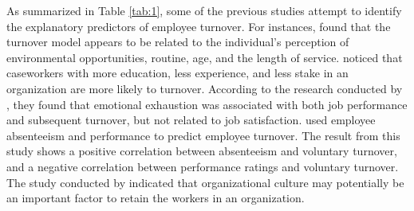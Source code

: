 As summarized in Table \ref{tab:1}, some of the previous studies attempt to identify the explanatory predictors of employee turnover. For instances, \citet{bluedorn1982} found that the turnover model appears to be related to the individual’s perception of environmental opportunities, routine, age, and the length of service. \citet{balfour1993} noticed that caseworkers with more education, less experience, and less stake in an organization are more likely to turnover. According to the research conducted by \citet{wright1998}, they found that emotional exhaustion was associated with both job performance and subsequent turnover, but not related to job satisfaction. \citet{morrow1999} used employee absenteeism and performance to predict employee turnover. The result from this study shows a positive correlation between absenteeism and voluntary turnover, and a negative correlation between performance ratings and voluntary turnover. The study conducted by \citet{thaden2010} indicated that organizational culture may potentially be an important factor to retain the workers in an organization. 

